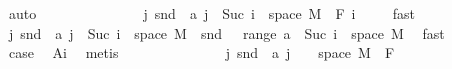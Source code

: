 \begin{isabellebody}
\ auto\isanewline
\ \ \isacommand{{\isacharbraceleft}{\kern0pt}}\isamarkupfalse%
\isanewline
\ \ \ \ \isamarkupfalse%
\ {}\isanewline
\ \ \ \ \isamarkupfalse%
\ {\isachardoublequoteopen}{\isacharparenleft}{\kern0pt}{\isasymUnion}j{\isachardot}{\kern0pt}\ snd\ {\isacharbackquote}{\kern0pt}\ {\isacharparenleft}{\kern0pt}a\ j\ {\isasyminter}\ {\isacharparenleft}{\kern0pt}{\isacharbraceleft}{\kern0pt}Suc\ i{\isacharbraceright}{\kern0pt}\ {\isasymtimes}\ space\ M{\isacharparenright}{\kern0pt}{\isacharparenright}{\kern0pt}{\isacharparenright}{\kern0pt}\ {\isasymin}\ F\ i{\isachardoublequoteclose}\ \isamarkupfalse%
\ {\isacharasterisk}{\kern0pt}\ \isamarkupfalse%
\ fast\isanewline
\ \ \ \ \isamarkupfalse%
\ \isamarkupfalse%
\ {\isachardoublequoteopen}{\isacharparenleft}{\kern0pt}{\isasymUnion}j{\isachardot}{\kern0pt}\ snd\ {\isacharbackquote}{\kern0pt}\ {\isacharparenleft}{\kern0pt}a\ j\ {\isasyminter}\ {\isacharparenleft}{\kern0pt}{\isacharbraceleft}{\kern0pt}Suc\ i{\isacharbraceright}{\kern0pt}\ {\isasymtimes}\ space\ M{\isacharparenright}{\kern0pt}{\isacharparenright}{\kern0pt}{\isacharparenright}{\kern0pt}\ {\isacharequal}{\kern0pt}\ snd\ {\isacharbackquote}{\kern0pt}\ {\isacharparenleft}{\kern0pt}{\isasymUnion}\ {\isacharparenleft}{\kern0pt}range\ a{\isacharparenright}{\kern0pt}\ {\isasyminter}\ {\isacharparenleft}{\kern0pt}{\isacharbraceleft}{\kern0pt}Suc\ i{\isacharbraceright}{\kern0pt}\ {\isasymtimes}\ space\ M{\isacharparenright}{\kern0pt}{\isacharparenright}{\kern0pt}{\isachardoublequoteclose}\ \isamarkupfalse%
\ fast\isanewline
\ \ \ \ \isamarkupfalse%
\ \isamarkupfalse%
\ {\isacharquery}{\kern0pt}case\ \isamarkupfalse%
\ A{\isacharunderscore}{\kern0pt}i\ \isamarkupfalse%
\ metis\isanewline
\ \ \isamarkupfalse%
\isanewline
\ \ \ \ \isamarkupfalse%
\ {}\isanewline
\ \ \ \ \isamarkupfalse%
\ {\isachardoublequoteopen}{\isacharparenleft}{\kern0pt}{\isasymUnion}j{\isachardot}{\kern0pt}\ snd\ {\isacharbackquote}{\kern0pt}\ {\isacharparenleft}{\kern0pt}a\ j\ {\isasyminter}\ {\isacharparenleft}{\kern0pt}{\isacharbraceleft}{\kern0pt}{}{\isacharbraceright}{\kern0pt}\ {\isasymtimes}\ space\ M{\isacharparenright}{\kern0pt}{\isacharparenright}{\kern0pt}{\isacharparenright}{\kern0pt}\ {\isasymin}\ F\ {}{\isachardoublequoteclose}\ \isamarkupfalse%
\ {\isacharasterisk}{\kern0pt}\ \isamarkupfalse%

\end{isabellebody}
